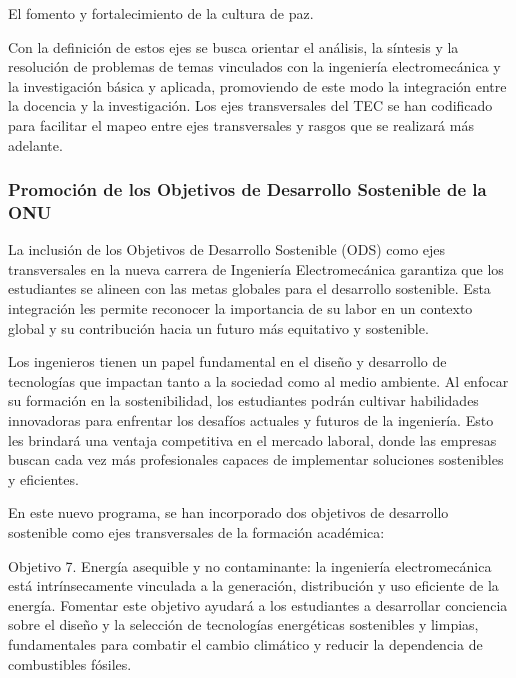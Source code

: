 \begin{cuadrocafe}[EJT09]
El fomento y fortalecimiento de la cultura de paz.
\end{cuadrocafe}

Con la definición de estos ejes se busca orientar el análisis, la síntesis y la resolución de problemas de temas vinculados con la ingeniería electromecánica y la investigación básica y aplicada, promoviendo de este modo la integración entre la docencia y la investigación. Los ejes transversales del TEC se han codificado para facilitar el mapeo entre ejes transversales y rasgos que se realizará más adelante.\par

\subsubsection*{Promoción de los Objetivos de Desarrollo Sostenible de la ONU}

La inclusión de los Objetivos de Desarrollo Sostenible (ODS) como ejes transversales en la nueva carrera de Ingeniería Electromecánica garantiza que los estudiantes se alineen con las metas globales para el desarrollo sostenible. Esta integración les permite reconocer la importancia de su labor en un contexto global y su contribución hacia un futuro más equitativo y sostenible.\par

Los ingenieros tienen un papel fundamental en el diseño y desarrollo de tecnologías que impactan tanto a la sociedad como al medio ambiente. Al enfocar su formación en la sostenibilidad, los estudiantes podrán cultivar habilidades innovadoras para enfrentar los desafíos actuales y futuros de la ingeniería. Esto les brindará una ventaja competitiva en el mercado laboral, donde las empresas buscan cada vez más profesionales capaces de implementar soluciones sostenibles y eficientes.\par

En este nuevo programa, se han incorporado dos objetivos de desarrollo sostenible como ejes transversales de la formación académica:\par

\begin{cuadrocafe}[ODS07]
Objetivo 7. Energía asequible y no contaminante: la ingeniería electromecánica está intrínsecamente vinculada a la generación, distribución y uso eficiente de la energía. Fomentar este objetivo ayudará a los estudiantes a desarrollar conciencia sobre el diseño y la selección de tecnologías energéticas sostenibles y limpias, fundamentales para combatir el cambio climático y reducir la dependencia de combustibles fósiles.
\end{cuadrocafe}

